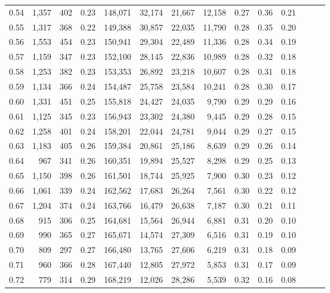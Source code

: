 \begin{tabular}{rrrrrrrrrrrrrr}
0.54 &  1,357 &  402 &  0.23 &  148,071 &   32,174 &  21,667 &  12,158 &  0.27 &  0.36 &      0.21 \\
0.55 &  1,317 &  368 &  0.22 &  149,388 &   30,857 &  22,035 &  11,790 &  0.28 &  0.35 &      0.20 \\
0.56 &  1,553 &  454 &  0.23 &  150,941 &   29,304 &  22,489 &  11,336 &  0.28 &  0.34 &      0.19 \\
0.57 &  1,159 &  347 &  0.23 &  152,100 &   28,145 &  22,836 &  10,989 &  0.28 &  0.32 &      0.18 \\
0.58 &  1,253 &  382 &  0.23 &  153,353 &   26,892 &  23,218 &  10,607 &  0.28 &  0.31 &      0.18 \\
0.59 &  1,134 &  366 &  0.24 &  154,487 &   25,758 &  23,584 &  10,241 &  0.28 &  0.30 &      0.17 \\
0.60 &  1,331 &  451 &  0.25 &  155,818 &   24,427 &  24,035 &   9,790 &  0.29 &  0.29 &      0.16 \\
0.61 &  1,125 &  345 &  0.23 &  156,943 &   23,302 &  24,380 &   9,445 &  0.29 &  0.28 &      0.15 \\
0.62 &  1,258 &  401 &  0.24 &  158,201 &   22,044 &  24,781 &   9,044 &  0.29 &  0.27 &      0.15 \\
0.63 &  1,183 &  405 &  0.26 &  159,384 &   20,861 &  25,186 &   8,639 &  0.29 &  0.26 &      0.14 \\
0.64 &    967 &  341 &  0.26 &  160,351 &   19,894 &  25,527 &   8,298 &  0.29 &  0.25 &      0.13 \\
0.65 &  1,150 &  398 &  0.26 &  161,501 &   18,744 &  25,925 &   7,900 &  0.30 &  0.23 &      0.12 \\
0.66 &  1,061 &  339 &  0.24 &  162,562 &   17,683 &  26,264 &   7,561 &  0.30 &  0.22 &      0.12 \\
0.67 &  1,204 &  374 &  0.24 &  163,766 &   16,479 &  26,638 &   7,187 &  0.30 &  0.21 &      0.11 \\
0.68 &    915 &  306 &  0.25 &  164,681 &   15,564 &  26,944 &   6,881 &  0.31 &  0.20 &      0.10 \\
0.69 &    990 &  365 &  0.27 &  165,671 &   14,574 &  27,309 &   6,516 &  0.31 &  0.19 &      0.10 \\
0.70 &    809 &  297 &  0.27 &  166,480 &   13,765 &  27,606 &   6,219 &  0.31 &  0.18 &      0.09 \\
0.71 &    960 &  366 &  0.28 &  167,440 &   12,805 &  27,972 &   5,853 &  0.31 &  0.17 &      0.09 \\
0.72 &    779 &  314 &  0.29 &  168,219 &   12,026 &  28,286 &   5,539 &  0.32 &  0.16 &      0.08 \\

\end{tabular}
